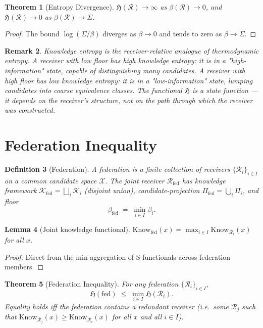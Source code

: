 \documentclass[twocolumn,11pt,a4paper]{article}
\newtheorem{theorem}{Theorem}[section]
\newtheorem{lemma}[theorem]{Lemma}
\newtheorem{definition}[theorem]{Definition}
\newtheorem{remark}[theorem]{Remark}
\newcommand{\Cands}{\mathcal{X}}
\newcommand{\Knowl}{\mathcal{K}}
\newcommand{\receiver}{\mathcal{R}}
\newcommand{\Sigmax}{\Sigma}
\newcommand{\Know}{\mathrm{Know}}
\newcommand{\Hknow}{\mathfrak{H}}
\begin{document}
\begin{theorem}[Entropy Divergence]
\label{thm:entropy-divergence}
$\Hknow(\receiver) \to \infty$ as $\beta(\receiver) \to 0$, and $\Hknow(\receiver) \to 0$ as $\beta(\receiver) \to \Sigmax$.
\end{theorem}

\begin{proof}
The bound $\log(\Sigmax/\beta)$ diverges as $\beta \to 0$ and tends to zero as $\beta \to \Sigmax$.
\end{proof}

\begin{remark}
\label{rem:entropy-thermodynamic}
Knowledge entropy is the receiver-relative analogue of thermodynamic entropy. A receiver with low floor has high knowledge entropy: it is in a "high-information" state, capable of distinguishing many candidates. A receiver with high floor has low knowledge entropy: it is in a "low-information" state, lumping candidates into coarse equivalence classes. The functional $\Hknow$ is a state function — it depends on the receiver's structure, not on the path through which the receiver was constructed.
\end{remark}

\section{Federation Inequality}
\label{sec:federation}

\begin{definition}[Federation]
\label{def:federation}
A \emph{federation} is a finite collection of receivers $\{\receiver_i\}_{i \in I}$ on a common candidate space $\Cands$. The \emph{joint receiver} $\receiver_{\text{fed}}$ has knowledge framework $\Knowl_{\text{fed}} = \bigsqcup_i \Knowl_i$ (disjoint union), candidate-projection $\Pi_{\text{fed}} = \bigcup_i \Pi_i$, and floor
\[
\beta_{\text{fed}} \;=\; \min_{i \in I} \beta_i.
\]
\end{definition}

\begin{lemma}[Joint knowledge functional]
\label{lem:joint-know}
$\Know_{\text{fed}}(x) = \max_{i \in I} \Know_{\receiver_i}(x)$ for all $x$.
\end{lemma}

\begin{proof}
Direct from the min-aggregation of S-functionals across federation members.
\end{proof}

\begin{theorem}[Federation Inequality]
\label{thm:federation-inequality}
For any federation $\{\receiver_i\}_{i \in I}$,
\[
\Hknow(\text{fed}) \;\leq\; \min_{i \in I} \Hknow(\receiver_i).
\]
Equality holds iff the federation contains a redundant receiver (i.e.\ some $\receiver_j$ such that $\Know_{\receiver_j}(x) \geq \Know_{\receiver_i}(x)$ for all $x$ and all $i \in I$).
\end{theorem}
\end{document}

